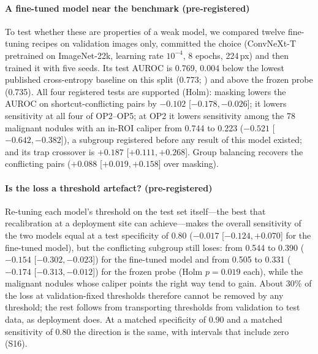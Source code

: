 \paragraph{A fine-tuned model near the benchmark (pre-registered)} To test whether these are properties of a weak
model, we compared twelve fine-tuning recipes on validation images only, committed the choice (ConvNeXt-T pretrained on
ImageNet-22k, learning rate $10^{-4}$, 8 epochs, 224\,px) and then trained it with five seeds. Its test AUROC is 0.769,
0.004 below the lowest published cross-entropy baseline on this split (0.773; \citealp{gong2022acl}) and above the
frozen probe (0.735). All four registered tests are supported (Holm): masking lowers the AUROC on shortcut-conflicting
pairs by $-0.102$ [$-0.178, -0.026$]; it lowers sensitivity at all four of OP2--OP5; at OP2 it lowers sensitivity among
the 78 malignant nodules with an in-ROI caliper from 0.744 to 0.223 ($-0.521$ [$-0.642, -0.382$]), a subgroup registered
before any result of this model existed; and its trap crossover is $+0.187$ [$+0.111, +0.268$]. Group balancing recovers
the conflicting pairs ($+0.088$ [$+0.019, +0.158$] over masking).

\paragraph{Is the loss a threshold artefact? (pre-registered)} Re-tuning each model's threshold on the test set
itself---the best that recalibration at a deployment site can achieve---makes the overall sensitivity of the two models
equal at a test specificity of 0.80 ($-0.017$ [$-0.124, +0.070$] for the fine-tuned model), but the conflicting subgroup
still loses: from 0.544 to 0.390 ($-0.154$ [$-0.302, -0.023$]) for the fine-tuned model and from 0.505 to 0.331
($-0.174$ [$-0.313, -0.012$]) for the frozen probe (Holm $p=0.019$ each), while the malignant nodules whose caliper
points the right way tend to gain. About 30\% of the loss at validation-fixed thresholds therefore cannot be removed by
any threshold; the rest follows from transporting thresholds from validation to test data, as deployment does. At a
matched specificity of 0.90 and a matched sensitivity of 0.80 the direction is the same, with intervals that include
zero (S16).

